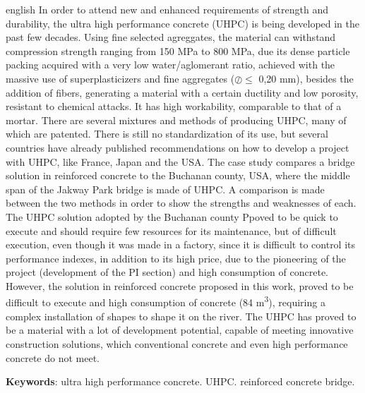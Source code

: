 \documentclass[
	12pt,				%
	openright,			%
	twoside,			%
	a4paper,			%
	english,			%
	french,				%
	spanish,			%
	brazil				%
	]{abntex2}
\begin{document}
\begin{resumo}[Abstract]
 \begin{otherlanguage*}{english}
     In order to attend new and enhanced requirements of strength and durability, the ultra high performance concrete (UHPC) is being developed in the past few decades. Using fine selected agreggates, the material can withstand compression strength ranging from 150 MPa to 800 MPa, due its dense particle packing acquired with a very low water/aglomerant ratio, achieved with the massive use of superplasticizers and fine aggregates ($ \oslash \leq $ 0,20 mm), besides the addition of fibers, generating a material with a certain ductility and low porosity, resistant to chemical  attacks. It has high workability, comparable to that of a mortar. There are several mixtures and methods of producing UHPC, many of which are patented. There is still no standardization of its use, but several countries have already published recommendations on how to develop a project with UHPC, like France, Japan and the USA. The case study compares a bridge solution in reinforced concrete to the Buchanan county, USA, where the middle span of the Jakway Park bridge is made of UHPC. A comparison is made between the two methods in order to show the strengths and weaknesses of each. The UHPC solution adopted by the Buchanan county Ppoved to be quick to execute and should require few resources for its maintenance, but of difficult execution, even though it was made in a factory, since it is difficult to control its performance indexes, in addition to its high price, due to the pioneering of the project (development of the PI section) and high consumption of concrete. However, the solution in reinforced concrete proposed in this work, proved to be difficult to execute and high consumption of concrete (84 m\textsuperscript{3}), requiring a complex installation of shapes to shape it on the river. The UHPC has proved to be a material with a lot of development potential, capable of meeting innovative construction solutions, which conventional concrete and even high performance concrete do not meet.

   \vspace{\onelineskip}
 
   \noindent 
   \textbf{Keywords}: ultra high performance concrete. UHPC. reinforced concrete bridge.
 \end{otherlanguage*}
\end{resumo}

 
\end{document}
